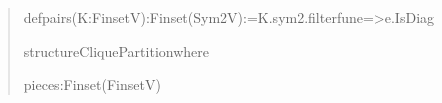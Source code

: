 \documentclass[english,11pt,a4paper]{article}
\newlength{\LeanCharWidth}
\begin{document}
\begin{quote}\fontsize{8.5}{10.2}\selectfont\ttfamily\raggedright\setlength{\parskip}{0pt}\settowidth{\LeanCharWidth}{0}
\noindent def\hspace*{\dimexpr 1\LeanCharWidth\relax}pairs\hspace*{\dimexpr 1\LeanCharWidth\relax}(K\hspace*{\dimexpr 1\LeanCharWidth\relax}:\hspace*{\dimexpr 1\LeanCharWidth\relax}Finset\hspace*{\dimexpr 1\LeanCharWidth\relax}V)\hspace*{\dimexpr 1\LeanCharWidth\relax}:\hspace*{\dimexpr 1\LeanCharWidth\relax}Finset\hspace*{\dimexpr 1\LeanCharWidth\relax}(Sym2\hspace*{\dimexpr 1\LeanCharWidth\relax}V)\hspace*{\dimexpr 1\LeanCharWidth\relax}:=\hspace*{\dimexpr 1\LeanCharWidth\relax}K.sym2.filter\hspace*{\dimexpr 1\LeanCharWidth\relax}fun\hspace*{\dimexpr 1\LeanCharWidth\relax}e\hspace*{\dimexpr 1\LeanCharWidth\relax}=>\hspace*{\dimexpr 1\LeanCharWidth\relax}{\LeanSymbols ¬}\hspace*{\dimexpr 1\LeanCharWidth\relax}e.IsDiag\par
\noindent \strut\par
\noindent structure\hspace*{\dimexpr 1\LeanCharWidth\relax}CliquePartition\hspace*{\dimexpr 1\LeanCharWidth\relax}where\par
\noindent \hspace*{\dimexpr 2\LeanCharWidth\relax}pieces\hspace*{\dimexpr 1\LeanCharWidth\relax}:\hspace*{\dimexpr 1\LeanCharWidth\relax}Finset\hspace*{\dimexpr 1\LeanCharWidth\relax}(Finset\hspace*{\dimexpr 1\LeanCharWidth\relax}V)\par

\end{quote}
\end{document}
